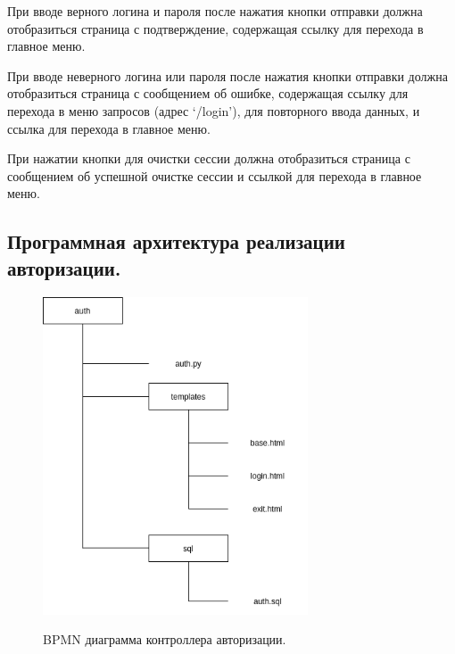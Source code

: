 \documentclass[12pt, a4paper]{article}
\begin{document}
    При вводе верного логина и пароля после нажатия кнопки отправки должна отобразиться
    страница с подтверждение, содержащая ссылку для перехода в главное меню.
    
    При вводе неверного логина или пароля после нажатия кнопки отправки должна
    отобразиться страница с сообщением об ошибке, содержащая ссылку для перехода в меню
    запросов (адрес ‘/login’), для повторного ввода данных, и ссылка для перехода в главное
    меню.
    
    При нажатии кнопки для очистки сессии должна отобразиться страница с сообщением об
    успешной очистке сессии и ссылкой для перехода в главное меню.
    
    \subsection{Программная архитектура реализации авторизации.}
    \begin{figure}[h]
    	\centering    %
    	\includegraphics[width=0.7\textwidth]{pictures/auth_arch.png}
    	\label{fig:pic8} %
    	\caption{BPMN диаграмма контроллера авторизации.}
    \end{figure}
	
\end{document}
